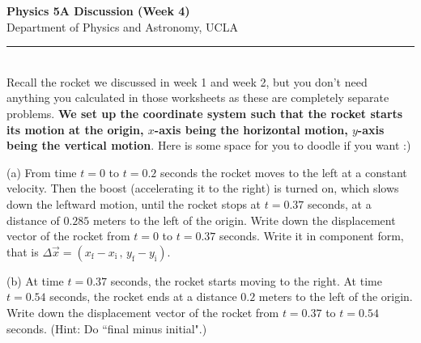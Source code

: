 \documentclass[11pt]{article}
\begin{document}
\Large \noindent \textbf{Physics 5A Discussion (Week 4)}\\
\normalsize
Department of Physics and Astronomy, UCLA\\
\noindent\rule{8cm}{0.4pt}\\

Recall the rocket we discussed in week 1 and week 2, but you don't need anything you calculated in those worksheets as these are completely separate problems. \textbf{We set up the coordinate system such that the rocket starts its motion at the origin, $x$-axis being the horizontal motion, $y$-axis being the vertical motion}. Here is some space for you to doodle if you want :)\\ 
\hfill\newline\hfill\newline\hfill\newline
\hfill\newline\hfill\newline\hfill\newline

\noindent(a) From time $t = 0$ to $t=0.2$ seconds the rocket moves to the left at a constant velocity. Then the boost (accelerating it to the right) is turned on, which slows down the leftward motion, until the rocket stops at $t=0.37$ seconds, at a distance of $0.285$ meters to the left of the origin. Write down the displacement vector of the rocket from $t=0$ to $t=0.37$ seconds. Write it in component form, that is $\Delta\vec{x} = (x_{\text{f}}-x_{\text{i}}\, ,\, y_{\text{f}}-y_{\text{i}})$.\\
\hfill\newline\hfill\newline\hfill\newline
\hfill\newline\hfill\newline\hfill\newline

\noindent(b) At time $t=0.37$ seconds, the rocket starts moving to the right. At time $t=0.54$ seconds, the rocket ends at a distance $0.2$ meters to the left of the origin. Write down the displacement vector of the rocket from $t=0.37$ to $t=0.54$ seconds. (Hint: Do ``final minus initial".)\\
\hfill\newline\hfill\newline\hfill\newline
\hfill\newline\hfill\newline\hfill\newline
\end{document}
